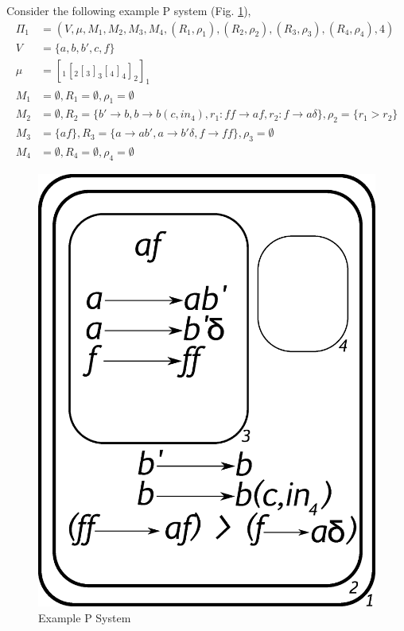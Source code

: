 Consider the following example P system (Fig. \ref{fig:psystem}),
\begin{align*}
\Pi_1 & = (V, \mu, M_1, M_2, M_3, M_4, (R_1, \rho_1), (R_2, \rho_2),
 (R_3, \rho_3), (R_4, \rho_4),4) \\
V & = \{a,b,b',c,f\} \\
\mu & = [_1[_2[_3]_3[_4]_4]_2]_1 \\
M_1 & = \emptyset, 
R_1 = \emptyset,
\rho_1 = \emptyset \\
M_2 & = \emptyset, 
R_2 = \{b' \rightarrow b, b \rightarrow b(c, in_4), r_1 : ff
 \rightarrow af, r_2 : f \rightarrow a\delta\},
\rho_2 = \{r_1 > r_2\} \\
M_3 & = \{af\},
R_3 = \{a \rightarrow ab', a \rightarrow b'\delta, f \rightarrow ff\},
\rho_3 = \emptyset \\
M_4 & = \emptyset,
R_4 = \emptyset,
\rho_4 = \emptyset
\end{align*}

\begin{figure}  
  \centering
  \includegraphics[scale=0.3]{psystem}
  \caption{Example P System}
  \label{fig:psystem}
\end{figure}

